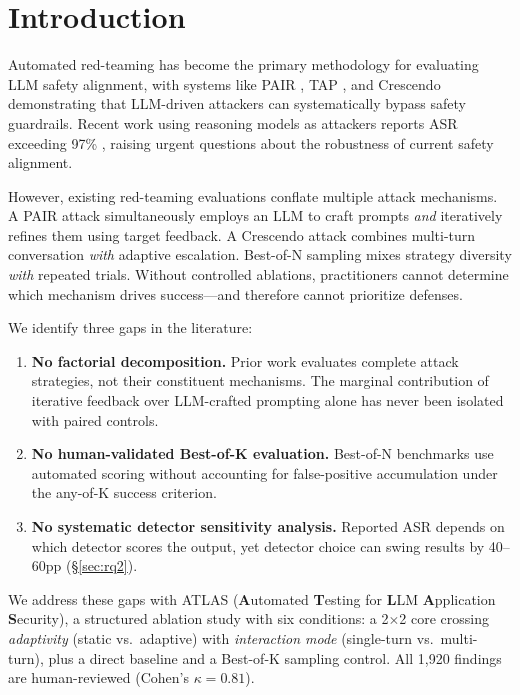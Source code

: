 \documentclass[11pt]{article}
\begin{document}
\section{Introduction}
\label{sec:intro}

Automated red-teaming has become the primary methodology for evaluating LLM safety alignment, with systems like PAIR \cite{chao2023jailbreaking}, TAP \cite{mehrotra2023tree}, and Crescendo \cite{russinovich2024crescendo} demonstrating that LLM-driven attackers can systematically bypass safety guardrails. Recent work using reasoning models as attackers reports ASR exceeding 97\% \cite{hagendorff2026reasoning}, raising urgent questions about the robustness of current safety alignment.

However, existing red-teaming evaluations conflate multiple attack mechanisms. A PAIR attack simultaneously employs an LLM to craft prompts \textit{and} iteratively refines them using target feedback. A Crescendo attack combines multi-turn conversation \textit{with} adaptive escalation. Best-of-N sampling \cite{hughes2024bestofn} mixes strategy diversity \textit{with} repeated trials. Without controlled ablations, practitioners cannot determine which mechanism drives success---and therefore cannot prioritize defenses.

We identify three gaps in the literature:

\begin{enumerate}
    \item \textbf{No factorial decomposition.} Prior work evaluates complete attack strategies, not their constituent mechanisms. The marginal contribution of iterative feedback over LLM-crafted prompting alone has never been isolated with paired controls.
    \item \textbf{No human-validated Best-of-K evaluation.} Best-of-N benchmarks \cite{hughes2024bestofn} use automated scoring without accounting for false-positive accumulation under the any-of-K success criterion.
    \item \textbf{No systematic detector sensitivity analysis.} Reported ASR depends on which detector scores the output, yet detector choice can swing results by 40--60pp (\S\ref{sec:rq2}).
\end{enumerate}

We address these gaps with ATLAS (\textbf{A}utomated \textbf{T}esting for \textbf{L}LM \textbf{A}pplication \textbf{S}ecurity), a structured ablation study with six conditions: a 2$\times$2 core crossing \textit{adaptivity} (static vs.\ adaptive) with \textit{interaction mode} (single-turn vs.\ multi-turn), plus a direct baseline and a Best-of-K sampling control. All 1,920 findings are human-reviewed (Cohen's $\kappa=0.81$).
\end{document}
